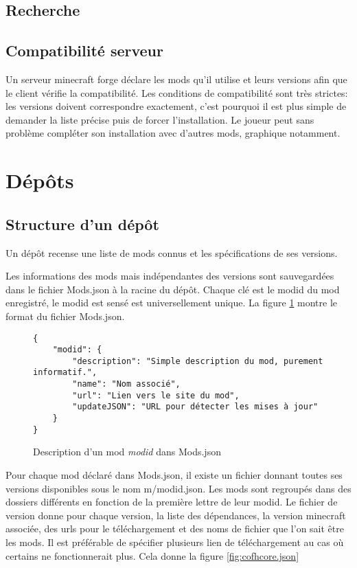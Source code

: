 \documentclass{article}
\begin{document}
\subsection{Recherche}

\subsection{Compatibilité serveur}
Un serveur minecraft forge déclare les mods qu'il utilise et leurs versions afin que le client vérifie la compatibilité.
Les conditions de compatibilité sont très strictes: les versions doivent correspondre exactement, c'est pourquoi il est plus simple de demander la liste précise puis de forcer l'installation.
Le joueur peut sans problème compléter son installation avec d'autres mods, graphique notamment.


%
%
\section{Dépôts}
\label{section:depot}
\subsection{Structure d'un dépôt}
Un dépôt recense une liste de mods connus et les spécifications de ses versions.

Les informations des mods mais indépendantes des versions sont sauvegardées dans le fichier \textsf{Mods.json} à la racine du dépôt.
Chaque clé est le modid du mod enregistré, le modid est sensé est universellement unique.
La figure \ref{fig:Mods.json} montre le format du fichier \textsf{Mods.json}.

\begin{figure}[h]
\begin{verbatim}
{
    "modid": {
        "description": "Simple description du mod, purement informatif.",
        "name": "Nom associé",
        "url": "Lien vers le site du mod",
        "updateJSON": "URL pour détecter les mises à jour"
    }
}
\end{verbatim}
\caption{Description d'un mod \textit{modid} dans \textsf{Mods.json}}
\label{fig:Mods.json}
\end{figure}

Pour chaque mod déclaré dans \textsf{Mods.json}, il existe un fichier donnant toutes ses versions disponibles sous le nom \textsf{m/modid.json}.
Les mods sont regroupés dans des dossiers différents en fonction de la première lettre de leur modid.
Le fichier de version donne pour chaque version, la liste des dépendances, la version minecraft associée, des urls pour le téléchargement et des noms de fichier que l'on sait être les mods.
Il est préférable de spécifier plusieurs lien de téléchargement au cas où certains ne fonctionnerait plus.
Cela donne la figure \ref{fig:cofhcore.json}
\end{document}
